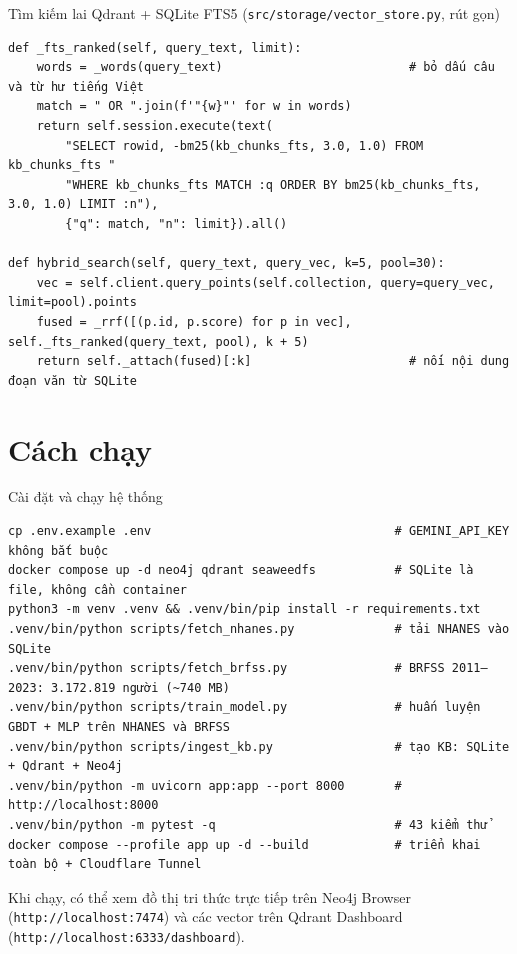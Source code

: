 \begin{code}{Tìm kiếm lai Qdrant + SQLite FTS5 (\texttt{src/storage/vector\_store.py}, rút gọn)}
\label{lst:hybrid}
\begin{verbatim}
def _fts_ranked(self, query_text, limit):
    words = _words(query_text)                          # bỏ dấu câu và từ hư tiếng Việt
    match = " OR ".join(f'"{w}"' for w in words)
    return self.session.execute(text(
        "SELECT rowid, -bm25(kb_chunks_fts, 3.0, 1.0) FROM kb_chunks_fts "
        "WHERE kb_chunks_fts MATCH :q ORDER BY bm25(kb_chunks_fts, 3.0, 1.0) LIMIT :n"),
        {"q": match, "n": limit}).all()

def hybrid_search(self, query_text, query_vec, k=5, pool=30):
    vec = self.client.query_points(self.collection, query=query_vec, limit=pool).points
    fused = _rrf([(p.id, p.score) for p in vec], self._fts_ranked(query_text, pool), k + 5)
    return self._attach(fused)[:k]                      # nối nội dung đoạn văn từ SQLite
\end{verbatim}
\end{code}

\section{Cách chạy}

\begin{code}{Cài đặt và chạy hệ thống}
\label{lst:run}
\begin{verbatim}
cp .env.example .env                                  # GEMINI_API_KEY không bắt buộc
docker compose up -d neo4j qdrant seaweedfs           # SQLite là file, không cần container
python3 -m venv .venv && .venv/bin/pip install -r requirements.txt
.venv/bin/python scripts/fetch_nhanes.py              # tải NHANES vào SQLite
.venv/bin/python scripts/fetch_brfss.py               # BRFSS 2011–2023: 3.172.819 người (~740 MB)
.venv/bin/python scripts/train_model.py               # huấn luyện GBDT + MLP trên NHANES và BRFSS
.venv/bin/python scripts/ingest_kb.py                 # tạo KB: SQLite + Qdrant + Neo4j
.venv/bin/python -m uvicorn app:app --port 8000       # http://localhost:8000
.venv/bin/python -m pytest -q                         # 43 kiểm thử
docker compose --profile app up -d --build            # triển khai toàn bộ + Cloudflare Tunnel
\end{verbatim}
\end{code}

Khi chạy, có thể xem đồ thị tri thức trực tiếp trên Neo4j Browser (\texttt{http://localhost:7474}) và các vector trên Qdrant Dashboard (\texttt{http://localhost:6333/dashboard}).

